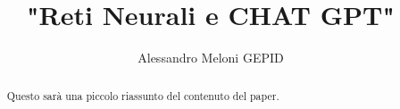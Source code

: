 \documentclass{article}
\title{"Reti Neurali e CHAT GPT"}
\author{Alessandro Meloni GEPID}
\date{}
\begin{document}
\maketitle
\begin{abstract}
    Questo sarà una piccolo riassunto del contenuto del paper.
\end{abstract}
\end{document}
